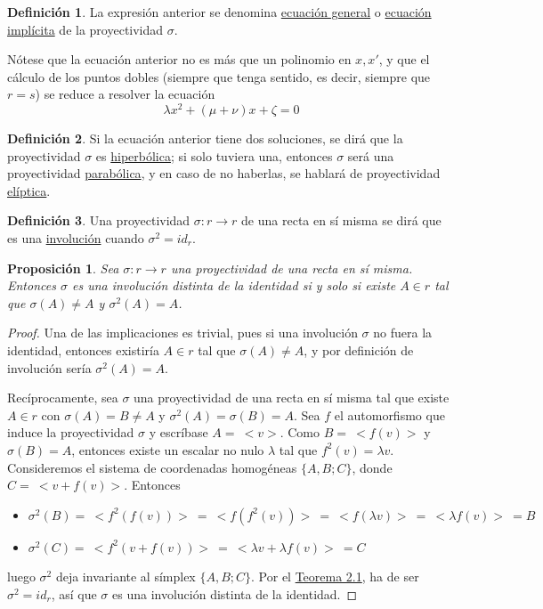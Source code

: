 \documentclass[12pt]{report}
\newtheorem{proposition}{Proposición}[chapter]
\theoremstyle{definition}
\newtheorem{definition}{Definición}[chapter]
\theoremstyle{definition}
\theoremstyle{remark}
\begin{document}
\begin{definition}
La expresión anterior se denomina \ul{ecuación general} o \ul{ecuación implícita} de la proyectividad $\sigma$.
\end{definition}

Nótese que la ecuación anterior no es más que un polinomio en $x, x'$, y que el cálculo de los puntos dobles (siempre que tenga sentido, es decir, siempre que $r = s$) se reduce a resolver la ecuación
\[\lambda x^2+(\mu+\nu)x + \zeta = 0\]

\begin{definition}
Si la ecuación anterior tiene dos soluciones, se dirá que la proyectividad $\sigma$ es \ul{hiperbólica}; si solo tuviera una, entonces $\sigma$ será una proyectividad \ul{parabólica}, y en caso de no haberlas, se hablará de proyectividad \ul{elíptica}.
\end{definition}

\begin{definition}
Una proyectividad $\sigma \colon r \to r$ de una recta en sí misma se dirá que es una \ul{involución} cuando $\sigma^2 = id_r$.
\end{definition}

\begin{proposition}
\label{prop2.6.}
Sea $\sigma \colon r \to r$ una proyectividad de una recta en sí misma. Entonces $\sigma$ es una involución distinta de la identidad si y solo si existe $A \in r$ tal que $\sigma(A) \neq A$ y $\sigma^2(A) = A$.
\end{proposition}

\begin{proof}
Una de las implicaciones es trivial, pues si una involución $\sigma$ no fuera la identidad, entonces existiría $A \in r$ tal que $\sigma(A) \neq A$, y por definición de involución sería $\sigma^2(A) = A$.

\vspace{2mm}
Recíprocamente, sea $\sigma$ una proyectividad de una recta en sí misma tal que existe $A \in r$ con $\sigma(A) = B \neq A$ y $\sigma^2(A) = \sigma(B) = A$. Sea $f$ el automorfismo que induce la proyectividad $\sigma$ y escríbase $A = \ <v>$. Como $B = \ <f(v)>$ y $\sigma(B) = A$, entonces existe un escalar no nulo $\lambda$ tal que $f^2(v) = \lambda v$. Consideremos el sistema de coordenadas homogéneas $\{A,B;C\}$, donde $C = \ <v+f(v)>$. Entonces
\begin{itemize}
    \item $\sigma^2(B) = \ <f^2(f(v))> \ = \ <f(f^2(v))> \ = \ <f(\lambda v)> \ = \ <\lambda f(v)> \ = B$
    \item $\sigma^2(C) = \ <f^2(v+f(v))> \ = \ <\lambda v + \lambda f(v)> \ = C$
\end{itemize}
luego $\sigma^2$ deja invariante al símplex $\{A,B;C\}$. Por el \hyperref[teo2.1.]{\color{blue}Teorema 2.1}, ha de ser $\sigma^2 = id_r$, así que $\sigma$ es una involución distinta de la identidad.
\end{proof}
\end{document}
